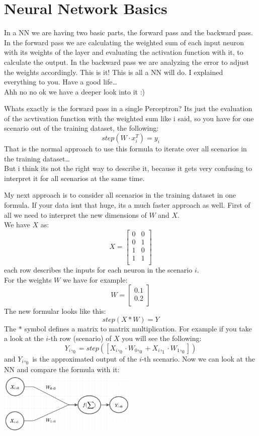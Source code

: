 \documentclass[
]{book}
\begin{document}
\hypertarget{neural-network-basics}{%
\section{Neural Network Basics}\label{neural-network-basics}}

In a NN we are having two basic parts, the forward pass and the backward pass. In the forward pass we are calculating the weighted sum of each input neuron with its weights of the layer and evaluating the activation function with it, to calculate the output. In the backward pass we are analyzing the error to adjust the weights accordingly. This is it! This is all a NN will do. I explained everything to you. Have a good life\ldots{}\\
Ahh no no ok we have a deeper look into it :)

Whats exactly is the forward pass in a single Perceptron? Its just the evaluation of the acvtivation function with the weighted sum like i said, so you have for one scenario out of the training dataset, the following:
\[
  step(W \cdot x^T_i) = y_i
\]
That is the normal approach to use this formula to iterate over all scenarios in the training dataset\ldots{}\\
But i think its not the right way to describe it, because it gets very confusing to interpret it for all scenarios at the same time.

My next approach is to consider all scenarios in the training dataset in one formula. If your data isnt that huge, its a much faster approach as well. First of all we need to interpret the new dimensions of \(W\) and \(X\).\\
We have \(X\) as:
\[
  X = \left[
  \begin{array}{cc}
  0 & 0 \\
  0 & 1 \\
  1 & 0 \\
  1 & 1 \\
  \end{array}
  \right]
\]
each row describes the inputs for each neuron in the scenario \(i\).\\
For the weights \(W\) we have for example:
\[
  W =\left[
  \begin{array}{c}
  0.1 \\ 
  0.2 \\ 
  \end{array}
  \right]
\]
The new formular looks like this:
\[
  step(X * W) = Y
\]
The \(*\) symbol defines a matrix to matrix multiplication. For example if you take a look at the \(i\)-th row (scenario) of \(X\) you will see the following:
\[
  Y_i,_0 = step([X_i,_0 \cdot W_0,_0 + X_i,_1 \cdot W_1,_0 ])
\]
and \(Y_i,_0\) is the approximated output of the \(i\)-th scenario. Now we can look at the NN and compare the formula with it:\\
\includegraphics[width=0.5\textwidth,height=\textheight]{./img/NN_01_v4.png}
\end{document}
